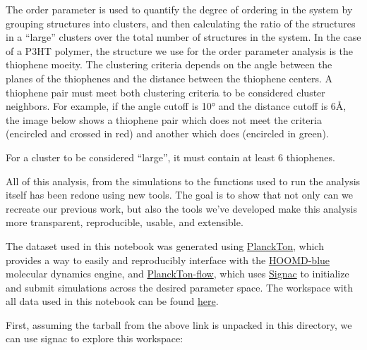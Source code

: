     \begin{center}
    \end{center}

The order parameter is used to quantify the degree of ordering in the
system by grouping structures into clusters, and then calculating the
ratio of the structures in a ``large'' clusters over the total number of
structures in the system. In the case of a P3HT polymer, the structure
we use for the order parameter analysis is the thiophene moeity. The
clustering criteria depends on the angle between the planes of the
thiophenes and the distance between the thiophene centers. A thiophene
pair must meet both clustering criteria to be considered cluster
neighbors. For example, if the angle cutoff is 10° and the distance
cutoff is 6\AA, the image below shows a thiophene pair which does not meet
the criteria (encircled and crossed in red) and another which does
(encircled in green).

    \begin{center}
    \end{center}

For a cluster to be considered ``large'', it must contain at least 6
thiophenes.

All of this analysis, from the simulations to the functions used to run
the analysis itself has been redone using new tools. The goal is to show
that not only can we recreate our previous work, but also the tools
we've developed make this analysis more transparent, reproducible,
usable, and extensible.

The dataset used in this notebook was generated using
\href{https://github.com/cmelab/planckton-flow}{PlanckTon}, which
provides a way to easily and reproducibly interface with the
\href{https://hoomd-blue.readthedocs.io/en/latest/index.html}{HOOMD-blue}
molecular dynamics engine, and
\href{https://github.com/cmelab/planckton-flow}{PlanckTon-flow}, which
uses \href{https://docs.signac.io/en/latest/}{Signac} to initialize and
submit simulations across the desired parameter space. The workspace
with all data used in this notebook can be found
\href{https://zenodo.org/record/5911940}{here}.

First, assuming the tarball from the above link is unpacked in this
directory, we can use signac to explore this workspace:

